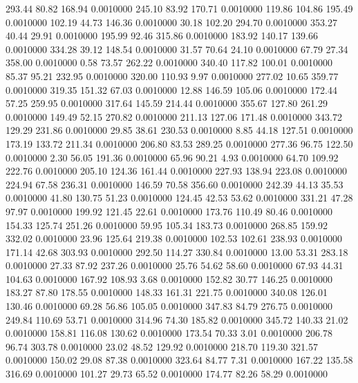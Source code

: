  293.44   80.82  168.94   0.0010000
 245.10   83.92  170.71   0.0010000
 119.86  104.86  195.49   0.0010000
 102.19   44.73  146.36   0.0010000
  30.18  102.20  294.70   0.0010000
 353.27   40.44   29.91   0.0010000
 195.99   92.46  315.86   0.0010000
 183.92  140.17  139.66   0.0010000
 334.28   39.12  148.54   0.0010000
  31.57   70.64   24.10   0.0010000
  67.79   27.34  358.00   0.0010000
   0.58   73.57  262.22   0.0010000
 340.40  117.82  100.01   0.0010000
  85.37   95.21  232.95   0.0010000
 320.00  110.93    9.97   0.0010000
 277.02   10.65  359.77   0.0010000
 319.35  151.32   67.03   0.0010000
  12.88  146.59  105.06   0.0010000
 172.44   57.25  259.95   0.0010000
 317.64  145.59  214.44   0.0010000
 355.67  127.80  261.29   0.0010000
 149.49   52.15  270.82   0.0010000
 211.13  127.06  171.48   0.0010000
 343.72  129.29  231.86   0.0010000
  29.85   38.61  230.53   0.0010000
   8.85   44.18  127.51   0.0010000
 173.19  133.72  211.34   0.0010000
 206.80   83.53  289.25   0.0010000
 277.36   96.75  122.50   0.0010000
   2.30   56.05  191.36   0.0010000
  65.96   90.21    4.93   0.0010000
  64.70  109.92  222.76   0.0010000
 205.10  124.36  161.44   0.0010000
 227.93  138.94  223.08   0.0010000
 224.94   67.58  236.31   0.0010000
 146.59   70.58  356.60   0.0010000
 242.39   44.13   35.53   0.0010000
  41.80  130.75   51.23   0.0010000
 124.45   42.53   53.62   0.0010000
 331.21   47.28   97.97   0.0010000
 199.92  121.45   22.61   0.0010000
 173.76  110.49   80.46   0.0010000
 154.33  125.74  251.26   0.0010000
  59.95  105.34  183.73   0.0010000
 268.85  159.92  332.02   0.0010000
  23.96  125.64  219.38   0.0010000
 102.53  102.61  238.93   0.0010000
 171.14   42.68  303.93   0.0010000
 292.50  114.27  330.84   0.0010000
  13.00   53.31  283.18   0.0010000
  27.33   87.92  237.26   0.0010000
  25.76   54.62   58.60   0.0010000
  67.93   44.31  104.63   0.0010000
 167.92  108.93    3.68   0.0010000
 152.82   30.77  146.25   0.0010000
 183.27   87.80  178.55   0.0010000
 148.33  161.31  221.75   0.0010000
 340.08  126.01  130.46   0.0010000
  69.28   56.86  105.05   0.0010000
 347.83   84.79  276.75   0.0010000
 249.84  110.69   53.71   0.0010000
 314.96   74.30  185.82   0.0010000
 345.72  140.33   21.02   0.0010000
 158.81  116.08  130.62   0.0010000
 173.54   70.33    3.01   0.0010000
 206.78   96.74  303.78   0.0010000
  23.02   48.52  129.92   0.0010000
 218.70  119.30  321.57   0.0010000
 150.02   29.08   87.38   0.0010000
 323.64   84.77    7.31   0.0010000
 167.22  135.58  316.69   0.0010000
 101.27   29.73   65.52   0.0010000
 174.77   82.26   58.29   0.0010000
